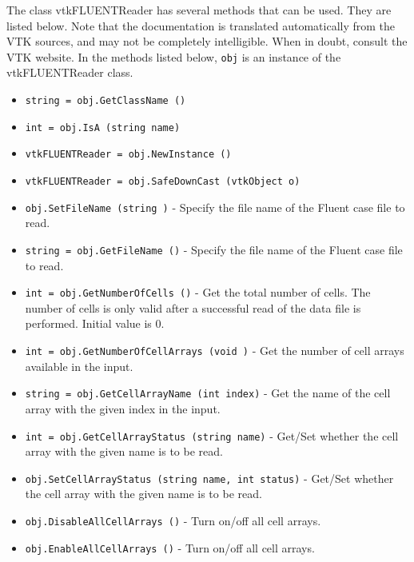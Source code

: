 The class vtkFLUENTReader has several methods that can be used.
  They are listed below.
Note that the documentation is translated automatically from the VTK sources,
and may not be completely intelligible.  When in doubt, consult the VTK website.
In the methods listed below, \verb|obj| is an instance of the vtkFLUENTReader class.
\begin{itemize}
\item  \verb|string = obj.GetClassName ()|

\item  \verb|int = obj.IsA (string name)|

\item  \verb|vtkFLUENTReader = obj.NewInstance ()|

\item  \verb|vtkFLUENTReader = obj.SafeDownCast (vtkObject o)|

\item  \verb|obj.SetFileName (string )| -  Specify the file name of the Fluent case file to read.

\item  \verb|string = obj.GetFileName ()| -  Specify the file name of the Fluent case file to read.

\item  \verb|int = obj.GetNumberOfCells ()| -  Get the total number of cells. The number of cells is only valid after a
 successful read of the data file is performed. Initial value is 0.

\item  \verb|int = obj.GetNumberOfCellArrays (void )| -  Get the number of cell arrays available in the input.

\item  \verb|string = obj.GetCellArrayName (int index)| -  Get the name of the  cell array with the given index in
 the input.

\item  \verb|int = obj.GetCellArrayStatus (string name)| -  Get/Set whether the cell array with the given name is to
 be read.

\item  \verb|obj.SetCellArrayStatus (string name, int status)| -  Get/Set whether the cell array with the given name is to
 be read.

\item  \verb|obj.DisableAllCellArrays ()| -  Turn on/off all cell arrays.

\item  \verb|obj.EnableAllCellArrays ()| -  Turn on/off all cell arrays.


\end{itemize}
